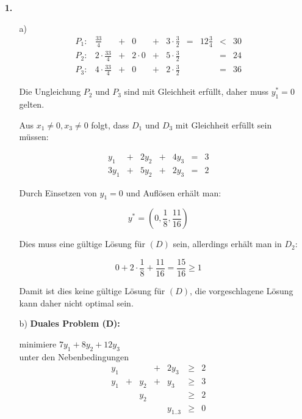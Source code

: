 \documentclass[a4paper,11pt]{article}
\author{\authorinfo}
\title{\titleinfo}
\date{\today}
\begin{document}
\maketitle
\begin{enumerate}

\item[\textbf{1.}]
    \begin{enumerate}
    \item[a)]
        \[\begin{array}{lrcrcrcrcr}
        P_1:&         \frac{33}{4} &+&         0 &+& 3 \cdot \frac{3}{2} &=& 12\frac{3}{4} &<& 30 \\
        P_2:& 2 \cdot \frac{33}{4} &+& 2 \cdot 0 &+& 5 \cdot \frac{3}{2} & &               &=& 24 \\
        P_3:& 4 \cdot \frac{33}{4} &+&         0 &+& 2 \cdot \frac{3}{2} & &               &=& 36
        \end{array}\]

        Die Ungleichung $P_2$ und $P_3$ sind mit Gleichheit erfüllt, daher muss
        $y_1^* = 0$ gelten.

        Aus $x_1 \ne 0, x_3 \ne 0$ folgt, dass $D_1$ und $D_3$ mit Gleichheit
        erfüllt sein müssen:

        \[\begin{array}{rcrcrcr}
         y_1 &+& 2y_2 &+& 4y_3 &=& 3 \\
        3y_1 &+& 5y_2 &+& 2y_3 &=& 2
        \end{array}\]

        Durch Einsetzen von $y_1 = 0$ und Auflösen erhält man:

        \[y^* = (0, \frac{1}{8}, \frac{11}{16}) \]

        Dies muss eine gültige Lösung für $(D)$ sein, allerdings erhält man in
        $D_2$:

        \[ 0 + 2 \cdot \frac{1}{8} + \frac{11}{16} = \frac{15}{16} \geq 1 \]

        Damit ist dies keine gültige Lösung für $(D)$, die vorgeschlagene Lösung
        kann daher nicht optimal sein.

    \newpage
    \item[b)]
        \textbf{Duales Problem (D):}

        minimiere \( 7y_1 + 8y_2 + 12y_3 \)\\
        unter den Nebenbedingungen \\
        \[\begin{array}{rcrcrcrcr}
             y_1 &   &      & + & 2y_3 & \geq & 2\\
             y_1 & + &  y_2 & + &  y_3 & \geq & 3\\
                 &   &  y_2 &   &      & \geq & 2\\
            &&&& y_{1..3} & \geq & 0
        \end{array}\]


\end{enumerate}
\end{enumerate}
\end{document}
